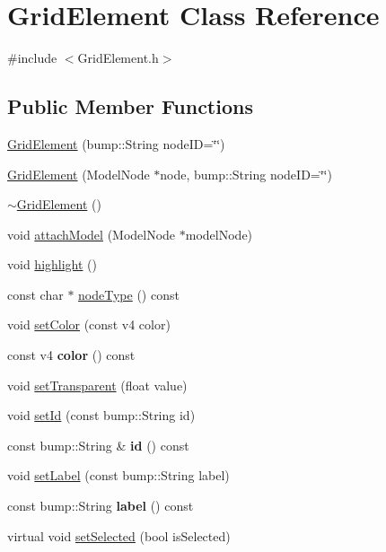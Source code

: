 \hypertarget{class_grid_element}{
\section{GridElement Class Reference}
\label{class_grid_element}
}


{\ttfamily \#include $<$GridElement.h$>$}\subsection*{Public Member Functions}
\begin{DoxyCompactItemize}
\item 
\hyperlink{class_grid_element_a87417c3c1fc9ff31fc96e402421937b6}{GridElement} (bump::String nodeID=\char`\"{}\char`\"{})
\item 
\hyperlink{class_grid_element_a265cf8c55be6ebb01f8c56e092008504}{GridElement} (ModelNode $\ast$node, bump::String nodeID=\char`\"{}\char`\"{})
\item 
\hyperlink{class_grid_element_ae6cc4885751f3372bf96c4a4568e79fb}{$\sim$GridElement} ()
\item 
void \hyperlink{class_grid_element_aaebf902834ef49b534433d7385fc398d}{attachModel} (ModelNode $\ast$modelNode)
\item 
void \hyperlink{class_grid_element_ab75d977fe8ea590a8fbf89d39beb3adb}{highlight} ()
\item 
const char $\ast$ \hyperlink{class_grid_element_a291030a5523dc79f73da322507f3c9ca}{nodeType} () const 
\item 
void \hyperlink{class_grid_element_a3c12632d21165343b41400939d633cb6}{setColor} (const v4 color)
\item 
\hypertarget{class_grid_element_a11fcac40b2f05a170c1d5236890ac842}{
const v4 {\bfseries color} () const }
\label{class_grid_element_a11fcac40b2f05a170c1d5236890ac842}

\item 
void \hyperlink{class_grid_element_a95cecc04d842554c8c4b74c6576c0a60}{setTransparent} (float value)
\item 
void \hyperlink{class_grid_element_a859628091b3d5076a4442d50f2ab2f10}{setId} (const bump::String id)
\item 
\hypertarget{class_grid_element_a431f61819a383a1d70b2499d7aca5263}{
const bump::String \& {\bfseries id} () const }
\label{class_grid_element_a431f61819a383a1d70b2499d7aca5263}

\item 
void \hyperlink{class_grid_element_a0d09f75799f8050ba3bbcee33913898c}{setLabel} (const bump::String label)
\item 
\hypertarget{class_grid_element_a76e70ad2be17d3cbd3edb546b1544fbc}{
const bump::String {\bfseries label} () const }
\label{class_grid_element_a76e70ad2be17d3cbd3edb546b1544fbc}

\item 
virtual void \hyperlink{class_grid_element_a31b297b76d790e467e6052a7b12cea7f}{setSelected} (bool isSelected)
\end{DoxyCompactItemize}
